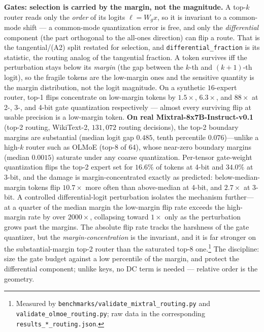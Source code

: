 \documentclass[11pt]{article}
\begin{document}
\textbf{Gates: selection is carried by the margin, not the magnitude.} A top-$k$
router reads only the \emph{order} of its logits $\ell = W_g x$, so it is
invariant to a common-mode shift --- a common-mode quantization error is free,
and only the \emph{differential} component (the part orthogonal to the all-ones
direction) can flip a route. That is the tangential/(A2) split restated for
selection, and \texttt{differential\_fraction} is its statistic, the routing
analog of the tangential fraction. A token survives iff the perturbation stays
below its \emph{margin} (the gap between the $k$-th and $(k{+}1)$-th logit), so
the fragile tokens are the low-margin ones and the sensitive quantity is the
margin distribution, not the logit magnitude. On a synthetic $16$-expert router,
top-1 flips concentrate on low-margin tokens by $1.5\times$, $6.3\times$, and
$88\times$ at 2-, 3-, and 4-bit gate quantization respectively --- almost every
surviving flip at usable precision is a low-margin token.
\textbf{On real Mixtral-8x7B-Instruct-v0.1} (top-2 routing, WikiText-2,
$131{,}072$ routing decisions), the top-2 boundary margins are substantial
(median logit gap $0.485$, tenth percentile $0.076$)---unlike a high-$k$ router
such as OLMoE (top-8 of 64), whose near-zero boundary margins (median $0.0015$)
saturate under any coarse quantization. Per-tensor gate-weight quantization flips
the top-2 expert set for $16.6\%$ of tokens at 4-bit and $34.0\%$ at 3-bit, and
the damage is margin-concentrated exactly as predicted: below-median-margin
tokens flip $10.7\times$ more often than above-median at 4-bit, and $2.7\times$
at 3-bit. A controlled differential-logit perturbation isolates the mechanism
further---at a quarter of the median margin the low-margin flip rate exceeds the
high-margin rate by over $2000\times$, collapsing toward $1\times$ only as the
perturbation grows past the margins. The absolute flip rate tracks the harshness
of the gate quantizer, but the \emph{margin-concentration} is the invariant, and
it is far stronger on the substantial-margin top-2 router than the saturated
top-8 one.\footnote{Measured by \texttt{benchmarks/validate\_mixtral\_routing.py}
and \texttt{validate\_olmoe\_routing.py}; raw data in the corresponding
\texttt{results\_*\_routing.json}.}
The discipline: size the gate budget against a low percentile of the margin, and
protect the differential component; unlike keys, no DC term is needed --- relative
order is the geometry.
\end{document}
